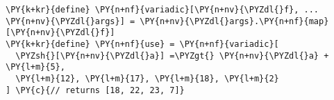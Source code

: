 \begin{Verbatim}[commandchars=\\\{\}]
\PY{k+kr}{define} \PY{n+nf}{variadic}[\PY{n+nv}{\PYZdl{}f}, ... \PY{n+nv}{\PYZdl{}args}] = \PY{n+nv}{\PYZdl{}args}.\PY{n+nf}{map}[\PY{n+nv}{\PYZdl{}f}]
\PY{k+kr}{define} \PY{n+nf}{use} = \PY{n+nf}{variadic}[
  \PYZsh{}[\PY{n+nv}{\PYZdl{}a}] =\PYZgt{} \PY{n+nv}{\PYZdl{}a} + \PY{l+m}{5}, 
  \PY{l+m}{12}, \PY{l+m}{17}, \PY{l+m}{18}, \PY{l+m}{2}
] \PY{c}{// returns [18, 22, 23, 7]}
\end{Verbatim}
